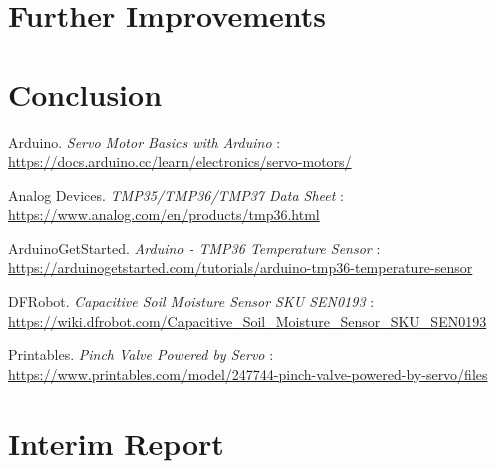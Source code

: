 \documentclass[a4paper,11pt]{article}
\begin{document}
\section{Further Improvements}
\label{sec:further_improvements}

\section{Conclusion}
\label{sec:conclusion}


\newpage
\appendix
\begin{thebibliography}{9}

Arduino. \textit{Servo Motor Basics with Arduino} : \\
\url{https://docs.arduino.cc/learn/electronics/servo-motors/}

Analog Devices. \textit{TMP35/TMP36/TMP37 Data Sheet} : \\
\url{https://www.analog.com/en/products/tmp36.html} 

ArduinoGetStarted. \textit{Arduino - TMP36 Temperature Sensor} : \\
\url{https://arduinogetstarted.com/tutorials/arduino-tmp36-temperature-sensor}

DFRobot. \textit{Capacitive Soil Moisture Sensor SKU SEN0193} : \\
\url{https://wiki.dfrobot.com/Capacitive_Soil_Moisture_Sensor_SKU_SEN0193}

Printables. \textit{Pinch Valve Powered by Servo} : \\
\url{https://www.printables.com/model/247744-pinch-valve-powered-by-servo/files}

\end{thebibliography}

\section{Interim Report}
\end{document}
